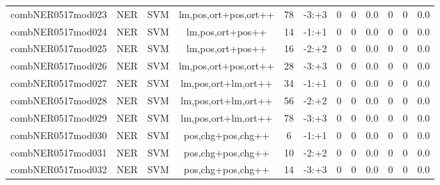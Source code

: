 \documentclass[a4paper]{article}
\begin{document}
\begin{landscape}
\begin{center}
\begin{tabular}{ |c|c|c|c|c|c|c|c|c|c|c|c|}
 
 	
 	\small{ combNER0517mod023 } & \small{ NER} & \small{  SVM }  & lm,pos,ort+pos,ort++  &  78 &  \small{  -3:+3 }  &  0 & 0 & 0.0  &  0 & 0 & 0.0 \\
 	

 
 	
 	\small{ combNER0517mod024 } & \small{ NER} & \small{  SVM }  & lm,pos,ort+pos++  &  14 &  \small{  -1:+1 }  &  0 & 0 & 0.0  &  0 & 0 & 0.0 \\
 	

 
 	
 	\small{ combNER0517mod025 } & \small{ NER} & \small{  SVM }  & lm,pos,ort+pos++  &  16 &  \small{  -2:+2 }  &  0 & 0 & 0.0  &  0 & 0 & 0.0 \\
 	

 
 	
 	\small{ combNER0517mod026 } & \small{ NER} & \small{  SVM }  & lm,pos,ort+pos,ort++  &  28 &  \small{  -3:+3 }  &  0 & 0 & 0.0  &  0 & 0 & 0.0 \\
 	

 
 	
 	\small{ combNER0517mod027 } & \small{ NER} & \small{  SVM }  & lm,pos,ort+lm,ort++  &  34 &  \small{  -1:+1 }  &  0 & 0 & 0.0  &  0 & 0 & 0.0 \\
 	

 
 	
 	\small{ combNER0517mod028 } & \small{ NER} & \small{  SVM }  & lm,pos,ort+lm,ort++  &  56 &  \small{  -2:+2 }  &  0 & 0 & 0.0  &  0 & 0 & 0.0 \\
 	

 
 	
 	\small{ combNER0517mod029 } & \small{ NER} & \small{  SVM }  & lm,pos,ort+lm,ort++  &  78 &  \small{  -3:+3 }  &  0 & 0 & 0.0  &  0 & 0 & 0.0 \\
 	

 
 	
 	\small{ combNER0517mod030 } & \small{ NER} & \small{  SVM }  & pos,chg+pos,chg++  &  6 &  \small{  -1:+1 }  &  0 & 0 & 0.0  &  0 & 0 & 0.0 \\
 	

 
 	
 	\small{ combNER0517mod031 } & \small{ NER} & \small{  SVM }  & pos,chg+pos,chg++  &  10 &  \small{  -2:+2 }  &  0 & 0 & 0.0  &  0 & 0 & 0.0 \\
 	

 
 	
 	\small{ combNER0517mod032 } & \small{ NER} & \small{  SVM }  & pos,chg+pos,chg++  &  14 &  \small{  -3:+3 }  &  0 & 0 & 0.0  &  0 & 0 & 0.0 \\
 	


\end{tabular}
\end{center}
\end{landscape}
\end{document}
